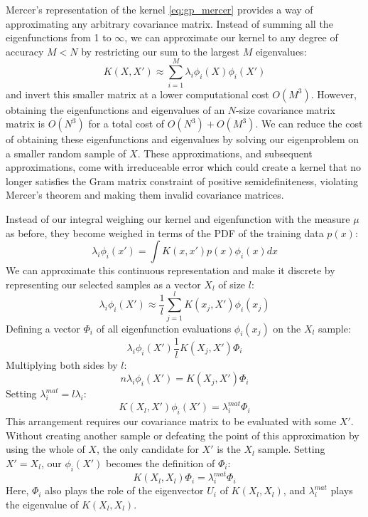 Mercer's representation of the kernel \ref{eq:gp_mercer} provides a way of approximating any arbitrary covariance matrix. Instead of summing all the eigenfunctions from 1 to $\infty$, we can approximate our kernel to any degree of accuracy $M < N$ by restricting our sum to the largest $M$ eigenvalues:
\begin{equation} \label{eq:gp_mercer_approx}
    K(X, X') \approx \sum_{i=1}^{M} \lambda_i \phi_i(X) \phi_i(X')
\end{equation}
and invert this smaller matrix at a lower computational cost $O(M^3)$. However, obtaining the eigenfunctions and eigenvalues of an $N$-size covariance matrix matrix is $O(N^3)$ for a total cost of $O(N^3) + O(M^3)$. We can reduce the cost of obtaining these eigenfunctions and eigenvalues by solving our eigenproblem on a smaller random sample of $X$. These approximations, and subsequent approximations, come with irreduceable error which could create a kernel that no longer satisfies the Gram matrix constraint of positive semidefiniteness, violating Mercer's theorem and making them invalid covariance matrices. 

Instead of our integral weighing our kernel and eigenfunction with the measure $\mu$ as before, they become weighed in terms of the PDF of the training data $p(x)$:
\begin{equation*}
    \lambda_i \phi_i(x') = \int K(x, x') p(x) \phi_i(x) dx
\end{equation*}
We can approximate this continuous representation and make it discrete by representing our selected samples as a vector $X_l$ of size $l$:
\begin{equation*}
    \lambda_i \phi_i(X') \approx \frac{1}{l} \sum_{j=1}^{l} K(x_j, X') \phi_i(x_j)
\end{equation*}
Defining a vector $\Phi_i$ of all eigenfunction evaluations $\phi_i(x_j)$ on the $X_l$ sample:
\begin{equation*}
    \lambda_i \phi_i(X') \frac{1}{l} K(X_j, X') \Phi_i
\end{equation*}
Multiplying both sides by $l$:
\begin{equation*}
    n \lambda_i \phi_i(X') = K(X_j, X') \Phi_i
\end{equation*}
Setting $\lambda_i^{mat} = l \lambda_i$:
\begin{equation*}
    K(X_l, X') \phi_i(X') = \lambda_i^{mat} \Phi_i
\end{equation*}
This arrangement requires our covariance matrix to be evaluated with some $X'$. Without creating another sample or defeating the point of this approximation by using the whole of $X$, the only candidate for $X'$ is the $X_l$ sample. Setting $X' = X_l$, our $\phi_i(X')$ becomes the definition of $\Phi_i$:
\begin{equation*}
    K(X_l, X_l) \Phi_i = \lambda_i^{mat} \Phi_i
\end{equation*}
Here, $\Phi_i$ also plays the role of the eigenvector $U_i$ of $K(X_l, X_l)$, and $\lambda_i^{mat}$ plays the eigenvalue of $K(X_l, X_l)$. 

